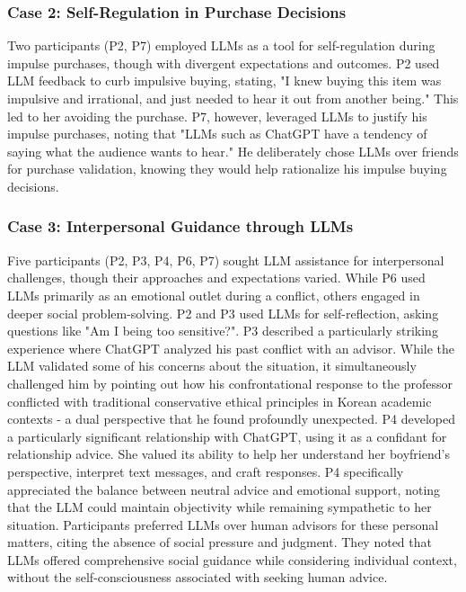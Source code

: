 \subsubsection{Case 2: Self-Regulation in Purchase Decisions}
Two participants (P2, P7) employed LLMs as a tool for self-regulation during impulse purchases, though with divergent expectations and outcomes. P2 used LLM feedback to curb impulsive buying, stating, "I knew buying this item was impulsive and irrational, and just needed to hear it out from another being." This led to her avoiding the purchase. P7, however, leveraged LLMs to justify his impulse purchases, noting that "LLMs such as ChatGPT have a tendency of saying what the audience wants to hear." He deliberately chose LLMs over friends for purchase validation, knowing they would help rationalize his impulse buying decisions.

\subsubsection{Case 3: Interpersonal Guidance through LLMs}
Five participants (P2, P3, P4, P6, P7) sought LLM assistance for interpersonal challenges, though their approaches and expectations varied. While P6 used LLMs primarily as an emotional outlet during a conflict, others engaged in deeper social problem-solving. P2 and P3 used LLMs for self-reflection, asking questions like "Am I being too sensitive?". P3 described a particularly striking experience where ChatGPT analyzed his past conflict with an advisor. While the LLM validated some of his concerns about the situation, it simultaneously challenged him by pointing out how his confrontational response to the professor conflicted with traditional conservative ethical principles in Korean academic contexts - a dual perspective that he found profoundly unexpected. P4 developed a particularly significant relationship with ChatGPT, using it as a confidant for relationship advice. She valued its ability to help her understand her boyfriend's perspective, interpret text messages, and craft responses. P4 specifically appreciated the balance between neutral advice and emotional support, noting that the LLM could maintain objectivity while remaining sympathetic to her situation. Participants preferred LLMs over human advisors for these personal matters, citing the absence of social pressure and judgment. They noted that LLMs offered comprehensive social guidance while considering individual context, without the self-consciousness associated with seeking human advice.

